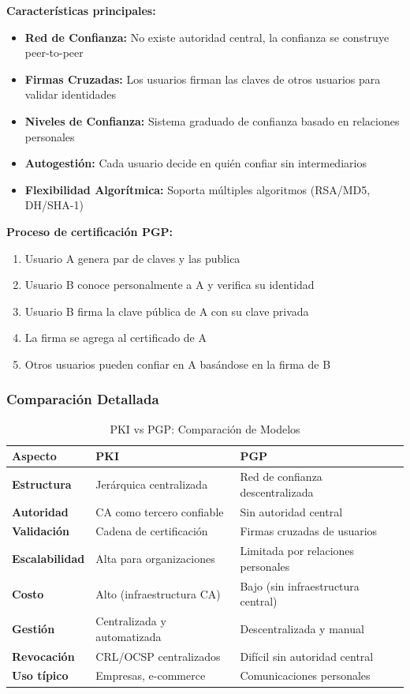 {\textbf{Características principales:}
\begin{itemize}
    \item \textbf{Red de Confianza:} No existe autoridad central, la confianza se construye peer-to-peer
    \item \textbf{Firmas Cruzadas:} Los usuarios firman las claves de otros usuarios para validar identidades
    \item \textbf{Niveles de Confianza:} Sistema graduado de confianza basado en relaciones personales
    \item \textbf{Autogestión:} Cada usuario decide en quién confiar sin intermediarios
    \item \textbf{Flexibilidad Algorítmica:} Soporta múltiples algoritmos (RSA/MD5, DH/SHA-1)
\end{itemize}

\textbf{Proceso de certificación PGP:}
\begin{enumerate}
    \item Usuario A genera par de claves y las publica
    \item Usuario B conoce personalmente a A y verifica su identidad
    \item Usuario B firma la clave pública de A con su clave privada
    \item La firma se agrega al certificado de A
    \item Otros usuarios pueden confiar en A basándose en la firma de B
\end{enumerate}

\subsubsection{Comparación Detallada}

\begin{table}[h]
\centering
\caption{PKI vs PGP: Comparación de Modelos}
\begin{tabular}{|l|l|l|}
\hline
\textbf{Aspecto} & \textbf{PKI} & \textbf{PGP} \\
\hline
\textbf{Estructura} & Jerárquica centralizada & Red de confianza descentralizada \\
\hline
\textbf{Autoridad} & CA como tercero confiable & Sin autoridad central \\
\hline
\textbf{Validación} & Cadena de certificación & Firmas cruzadas de usuarios \\
\hline
\textbf{Escalabilidad} & Alta para organizaciones & Limitada por relaciones personales \\
\hline
\textbf{Costo} & Alto (infraestructura CA) & Bajo (sin infraestructura central) \\
\hline
\textbf{Gestión} & Centralizada y automatizada & Descentralizada y manual \\
\hline
\textbf{Revocación} & CRL/OCSP centralizados & Difícil sin autoridad central \\
\hline
\textbf{Uso típico} & Empresas, e-commerce & Comunicaciones personales \\
\hline
\end{tabular}
\end{table}




}
